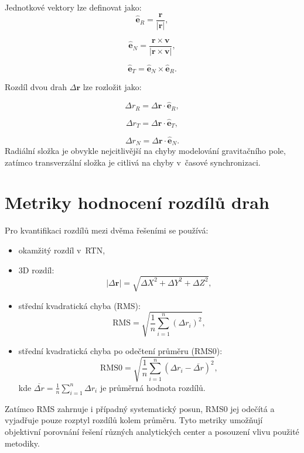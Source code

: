 \noindent Jednotkové vektory lze definovat jako:
\begin{equation}
\hat{\mathbf{e}}_R = \frac{\mathbf{r}}{|\mathbf{r}|},
\end{equation}

\begin{equation}
\hat{\mathbf{e}}_N = \frac{\mathbf{r} \times \mathbf{v}}{|\mathbf{r} \times \mathbf{v}|},
\end{equation}

\begin{equation}
\hat{\mathbf{e}}_T = \hat{\mathbf{e}}_N \times \hat{\mathbf{e}}_R.
\end{equation}

\noindent Rozdíl dvou drah $\Delta \mathbf{r}$ lze rozložit jako:

\begin{equation}
\Delta r_R = \Delta \mathbf{r} \cdot \hat{\mathbf{e}}_R,
\end{equation}

\begin{equation}
\Delta r_T = \Delta \mathbf{r} \cdot \hat{\mathbf{e}}_T,
\end{equation}

\begin{equation}
\Delta r_N = \Delta \mathbf{r} \cdot \hat{\mathbf{e}}_N.
\end{equation}
Radiální složka je obvykle nejcitlivější na chyby modelování gravitačního pole,
zatímco transverzální složka je citlivá na chyby v~časové synchronizaci.

\section{Metriky hodnocení rozdílů drah}

Pro kvantifikaci rozdílů mezi dvěma řešeními se používá:

\begin{itemize}
\item okamžitý rozdíl v~RTN,
\item 3D rozdíl:
\begin{equation}
|\Delta \mathbf{r}| = \sqrt{\Delta X^2 + \Delta Y^2 + \Delta Z^2},
\end{equation}
\item střední kvadratická chyba (RMS):
\begin{equation}
\mathrm{RMS} = \sqrt{\frac{1}{n}\sum_{i=1}^{n} (\Delta r_i)^2},
\end{equation}
\item střední kvadratická chyba po odečtení průměru (RMS0):
\begin{equation}
\mathrm{RMS0} = \sqrt{\frac{1}{n}\sum_{i=1}^{n} (\Delta r_i - \overline{\Delta r})^2},
\end{equation}
kde $\overline{\Delta r} = \frac{1}{n}\sum_{i=1}^{n} \Delta r_i$ je průměrná hodnota rozdílů.
\end{itemize}
Zatímco RMS zahrnuje i případný systematický posun, RMS0 jej odečítá
a vyjadřuje pouze rozptyl rozdílů kolem průměru. Tyto metriky umožňují
objektivní porovnání řešení různých analytických center a posouzení
vlivu použité metodiky.